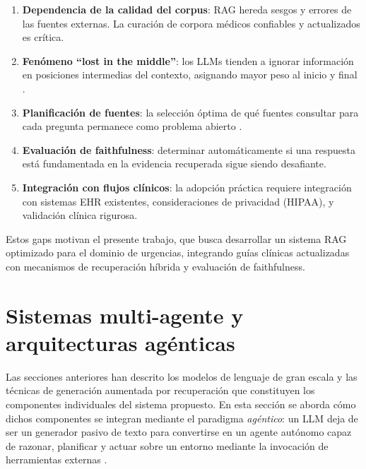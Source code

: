 \begin{enumerate}[nosep, leftmargin=*]
    \item \textbf{Dependencia de la calidad del corpus}: \ac{RAG} hereda sesgos y errores de las fuentes externas. La curación de corpora médicos confiables y actualizados es crítica.
    \item \textbf{Fenómeno ``lost in the middle''}: los \ac{LLM}s tienden a ignorar información en posiciones intermedias del contexto, asignando mayor peso al inicio y final \parencite{liu2024lost_middle}.
    \item \textbf{Planificación de fuentes}: la selección óptima de qué fuentes consultar para cada pregunta permanece como problema abierto \parencite{chen2025omnirag}.
    \item \textbf{Evaluación de faithfulness}: determinar automáticamente si una respuesta está fundamentada en la evidencia recuperada sigue siendo desafiante.
    \item \textbf{Integración con flujos clínicos}: la adopción práctica requiere integración con sistemas \ac{EHR} existentes, consideraciones de privacidad (\ac{HIPAA}), y validación clínica rigurosa.
\end{enumerate}

Estos gaps motivan el presente trabajo, que busca desarrollar un sistema \ac{RAG} optimizado para el dominio de urgencias, integrando guías clínicas actualizadas con mecanismos de recuperación híbrida y evaluación de faithfulness.

\section{Sistemas multi-agente y arquitecturas agénticas}
\label{sec:agentes}

Las secciones anteriores han descrito los modelos de lenguaje de gran escala y las técnicas de generación aumentada por recuperación que constituyen los componentes individuales del sistema propuesto. En esta sección se aborda cómo dichos componentes se integran mediante el paradigma \emph{agéntico}: un \ac{LLM} deja de ser un generador pasivo de texto para convertirse en un agente autónomo capaz de razonar, planificar y actuar sobre un entorno mediante la invocación de herramientas externas \parencite{Wang2024SurveyAgents}.

